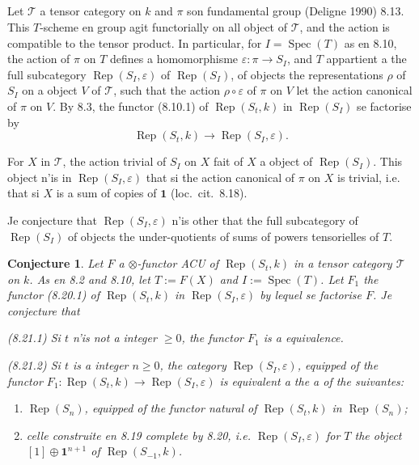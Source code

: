 \documentclass[11pt,a4paper]{article}
\theoremstyle{plain}
\newtheorem{conjecture}[theorem]{Conjecture}
\theoremstyle{definition}
\DeclareMathOperator{\Spec}{Spec}
\DeclareMathOperator{\Rep}{Rep}
\newcommand{\eps}{\varepsilon}
\begin{document}
\subsection{}
Let $\mathcal{T}$ a tensor category on $k$ and $\pi$ son fundamental group (Deligne 1990) 8.13. This $T$-scheme en group agit functorially on all object of $\mathcal{T}$, and the action is compatible to the tensor product. In particular, for $I = \Spec(T)$ as en 8.10, the action of $\pi$ on $T$ defines a homomorphisme $\eps : \pi \to S_I$, and $T$ appartient a the full subcategory $\Rep(S_I, \eps)$ of $\Rep(S_I)$, of objects the representations $\rho$ of $S_I$ on a object $V$ of $\mathcal{T}$, such that the action $\rho \circ \eps$ of $\pi$ on $V$ let the action canonical of $\pi$ on $V$. By 8.3, the functor (8.10.1) of $\Rep(S_t, k)$ in $\Rep(S_I)$ se factorise by
\begin{equation}
\Rep(S_t, k) \to \Rep(S_I, \eps). \tag{8.20.1}
\end{equation}

For $X$ in $\mathcal{T}$, the action trivial of $S_I$ on $X$ fait of $X$ a object of $\Rep(S_I)$. This object n'is in $\Rep(S_I, \eps)$ that si the action canonical of $\pi$ on $X$ is trivial, i.e. that si $X$ is a sum of copies of $\mathbf{1}$ (loc.~cit.~8.18).

Je conjecture that $\Rep(S_I, \eps)$ n'is other that the full subcategory of $\Rep(S_I)$ of objects the under-quotients of sums of powers tensorielles of $T$.

\begin{conjecture}
Let $F$ a $\otimes$-functor ACU of $\Rep(S_t, k)$ in a tensor category $\mathcal{T}$ on $k$. As en 8.2 and 8.10, let $T := F(X)$ and $I := \Spec(T)$. Let $F_1$ the functor (8.20.1) of $\Rep(S_t, k)$ in $\Rep(S_I, \eps)$ by lequel se factorise $F$. Je conjecture that

\textup{(8.21.1)} Si $t$ n'is not a integer $\geq 0$, the functor $F_1$ is a equivalence.

\textup{(8.21.2)} Si $t$ is a integer $n \geq 0$, the category $\Rep(S_I, \eps)$, equipped of the functor $F_1 : \Rep(S_t, k) \to \Rep(S_I, \eps)$ is equivalent a the a of the suivantes:
\begin{enumerate}[label=(\alph*)]
\item $\Rep(S_n)$, equipped of the functor natural of $\Rep(S_t, k)$ in $\Rep(S_n)$;
\item celle construite en 8.19 complete by 8.20, i.e. $\Rep(S_I, \eps)$ for $T$ the object $[1] \oplus \mathbf{1}^{n+1}$ of $\Rep(S_{-1}, k)$.
\end{enumerate}
\end{conjecture}
\end{document}
